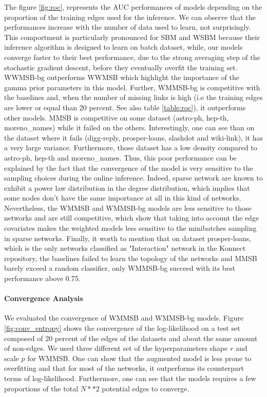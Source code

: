 The figure \ref{fig:roc}, represents the AUC performances of models depending on the proportion of the training edges used for the inference.  We can observe that the performances increase with the number of data used to learn, not surprisingly. This comportment is particularly pronounced for SBM and WSBM because their inference algorithm is designed to learn on batch dataset, while, our models converge faster to their best performance, due to the strong averaging step of the stochastic gradient descent, before they eventually overfit the training set.
WWMSB-bg outperforms WWMSB which highlight the importance of the gamma prior parameters in this model. Further, WMMSB-bg is competitive with the baselines and, when the number of missing links is high (i.e the training edges are lower or equal than 20 percent. See also table \ref{table:roc}), it outperforms other models. 
MMSB is competitive on some dataset (astro-ph, hep-th, moreno\_names) while it failed on the others. Interestingly, one can see than on the dataset where it fails (digg-reply, prosper-loans, slashdot and wiki-link), it has a very large variance. Furthermore, those dataset has a low density compared to astro-ph, hep-th and moreno\_names. Thus, this poor performance can be explained by the fact that the convergence of the model is very sensitive to the sampling choices during the online inference. Indeed, sparse network are known to exhibit a power law distribution in the degree distribution, which implies that some nodes don't have the same importance at all in this kind of networks. Nevertheless, the WMMSB and WMMSB-bg models are less sensitive to those networks and are still competitive, which show that taking into account the edge covariates makes the weighted models less sensitive to the minibatches sampling in sparse networks. Finally, it worth to mention that on dataset prosper-loans, which is the only networks classified as "Interaction" network in the Konnect repository, the baselines failed to learn the topology of the networks and MMSB barely exceed a random classifier, only WMMSB-bg succeed with its best performance above 0.75.



\begin{table}
\centering
	
\label{table:roc}
\end{table}




%
%
\paragraph {Convergence Analysis} We evaluated the convergence of WMMSB and WMMSB-bg models. Figure \ref{fig:conv_entropy} shows the convergence of the log-likelihood on a test set composed of 20 percent of the edges of the datasets and about the same amount of non-edges. We used three different set of the hyperparameters shape $r$ and scale $p$ for WMMSB. One can show that the augmented model is less prone to overfitting and that for most of the networks, it outperforms its counterpart terms of log-likelihood. Furthermore, one can see that the models requires a few proportions of the total $N**2$ potential edges to converge.


